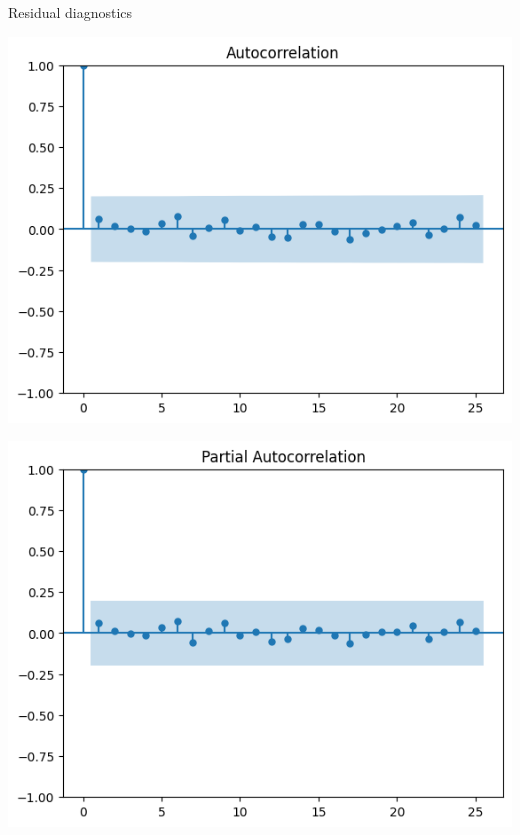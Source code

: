 \documentclass[12pt, aspectratio=169]{beamer}
\begin{document}
\begin{frame}{Residual diagnostics}
    \begin{center}
           \begin{minipage}{0.48\textwidth}
        \centering
        \includegraphics[width=\linewidth]{resid_acf.png}
    \end{minipage}
    \hfill
    \begin{minipage}{0.48\textwidth}
        \centering
        \includegraphics[width=\linewidth]{resid_pacf.png}
    \end{minipage}
    \end{center}
\end{frame}
\end{document}
